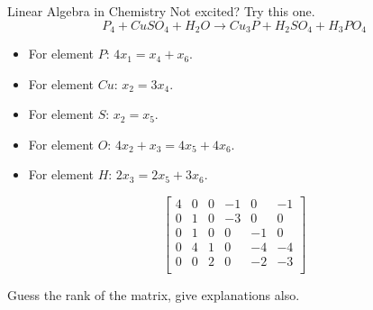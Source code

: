 \documentclass{beamer}
\begin{document}
\begin{frame}{Linear Algebra in Chemistry}
Not excited? Try this one.
\begin{equation*}
    P_4+CuSO_4+H_2O\rightarrow Cu_3P+H_2SO_4+H_3PO_4
\end{equation*}

\begin{itemize}
    \item For element $P$: $4x_1=x_4+x_6$.
    \item For element $Cu$: $x_2=3x_4$.
    \item For element $S$: $x_2=x_5$.
    \item For element $O$: $4x_2+x_3=4x_5+4x_6$.
    \item For element $H$: $2x_3=2x_5+3x_6$.
\end{itemize}

\begin{equation*}
    \left[ \begin{matrix}
        4&		0&		0&		-1&		0&		-1\\
        0&		1&		0&		-3&		0&		0\\
        0&		1&		0&		0&		-1&		0\\
        0&		4&		1&		0&		-4&		-4\\
        0&		0&		2&		0&		-2&		-3\\
    \end{matrix} \right]
\end{equation*}

Guess the rank of the matrix, give explanations also.
\end{frame}
\end{document}
